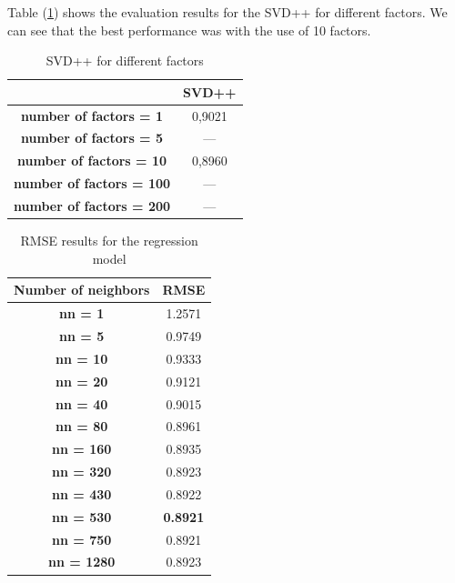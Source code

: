 \documentclass{sigish}
\begin{document}
Table (\ref{tab:svd_02}) shows the evaluation results for the SVD++ for different factors. We can see that the best performance was with the use of 10 factors.

\begin{table}[]
\centering
\begin{tabular}{|c|c|}
\hline
                     & \textbf{SVD++} \\ \hline
\textbf{number of factors = 1} & 0,9021        \\ \hline
\textbf{number of factors = 5} & ---        \\ \hline
\textbf{number of factors  = 10} & 0,8960      \\ \hline
\textbf{number of factors  = 100} & ---        \\ \hline
\textbf{number of factors  = 200} & ---        \\ \hline

\end{tabular}
\caption{SVD++ for different factors}
\label{tab:svd_02}
\end{table}

\begin{table}
	\centering	
	\begin{tabular}{|c|c|}
		\hline
		\textbf{Number of neighbors} & \textbf{RMSE} \\ \hline
		\textbf{nn = 1}  & 1.2571         \\ \hline
		\textbf{nn = 5} & 0.9749          \\ \hline
		\textbf{nn = 10} & 0.9333        \\ \hline
		\textbf{nn = 20} & 0.9121         \\ \hline
		\textbf{nn = 40} & 0.9015         \\ \hline
		\textbf{nn = 80} & 0.8961         \\ \hline
		\textbf{nn = 160} & 0.8935         \\ \hline
		\textbf{nn = 320} & 0.8923         \\ \hline
		\textbf{nn = 430} & 0.8922         \\ \hline
		\textbf{nn = 530} & \textbf{0.8921}			\\ \hline
		\textbf{nn = 750} & 0.8921         \\ \hline
		\textbf{nn = 1280} & 0.8923         \\ \hline
	\end{tabular}
	\caption{RMSE results for the regression model}
	\label{tab:regrRMSE}
\end{table}
\end{document}
